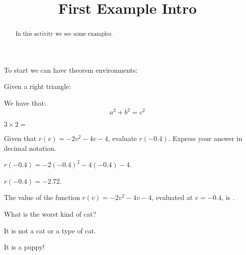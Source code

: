 \documentclass{ximera}
\title{First Example Intro}
\begin{document}
\begin{abstract}
In this activity we see some examples.
\end{abstract}
\maketitle

To start we can have theorem environments:

\begin{theorem}
Given a right triangle:

We have that:
\[
a^2 + b^2 = c^2
\]
\end{theorem}

\begin{exercise}
$3\times 2=$
\end{exercise}


\begin{exercise}
Given that $r(v)=-2 v^2-4 v-4$, evaluate $r(-0.4)$. Express your answer in decimal notation.
\begin{hint}
$r(-0.4)=-2 (-0.4)^2-4 (-0.4)-4$.
\end{hint}
\begin{hint}
$r(-0.4)=-2.72$.
\end{hint}

The value of the function $r(v)=-2 v^2-4 v-4$, evaluated at $v=-0.4$, is .
\end{exercise}



\begin{question}
What is the worst kind of cat?
\begin{prompt}
\begin{multipleChoice}
\end{multipleChoice}
\end{prompt}
\begin{hint}
It is not a cat or a type of cat.
\end{hint}
\begin{hint}
It is a puppy!
\end{hint}
\end{question}
\end{document}
